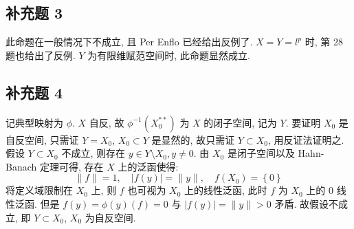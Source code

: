 \documentclass[../main.tex]{subfiles}
\begin{document}
\subsection{补充题 3}
此命题在一般情况下不成立, 且 Per Enflo 已经给出反例了.
$X = Y = l^p$ 时, 第 28 题也给出了反例.
$Y$ 为有限维赋范空间时, 此命题显然成立.

\subsection{补充题 4} %
记典型映射为 $\phi$.
$X$ 自反, 故 $\phi^{-1} \left( X_0^{**} \right)$ 为 $X$ 的闭子空间, 记为 $Y$.
要证明 $X_0$ 是自反空间, 只需证 $Y = X_0$,
$X_0 \subset Y$ 是显然的, 故只需证 $Y \subset X_0$, 用反证法证明之.
假设 $Y \subset X_0$ 不成立, 则存在 $y \in Y \setminus X_0, y \neq 0$.
由 $X_0$ 是闭子空间以及 Hahn-Banach 定理可得, 存在 $X$ 上的泛函使得:
\[
    \| f \| = 1,
    \quad \left| f \left( y \right) \right| = \| y \|,
    \quad f \left( X_0 \right) = \left\{ 0 \right\}
\]
将定义域限制在 $X_0$ 上, 则 $f$ 也可视为 $X_0$ 上的线性泛函, 此时 $f$ 为 $X_0$ 上的 $0$ 线性泛函.
但是 $f \left( y \right) = \phi \left( y \right) \left( f \right) = 0$ 与 $\left| f \left( y \right) \right| = \| y \| > 0$ 矛盾.
故假设不成立, 即 $Y \subset X_0$, $X_0$ 为自反空间.
\end{document}
